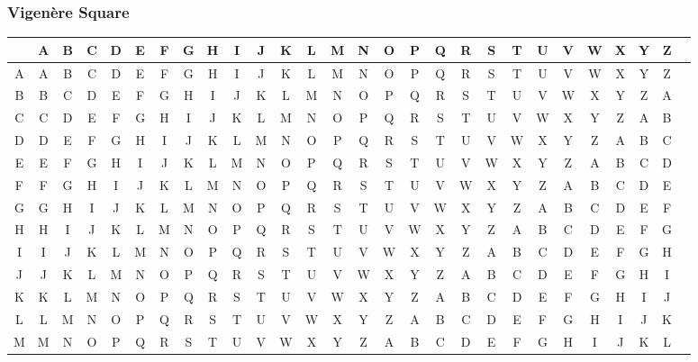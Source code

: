 \documentclass[12pt]{beamer}
\begin{document}
\begin{frame}
	
	\frametitle{Vigen\`{e}re Square}
	
	\begin{adjustbox}{max width=\textwidth}
		
		\begin{tabular}{| c || c | c | c | c | c | c | c | c | c | c | c | c | c | c | c | c | c | c | c | c | c | c | c | c | c | c | c ||}
			\hline
			& A & B & C & D & E & F & G & H & I & J & K & L & M & N & O & P & Q & R & S & T & U & V & W & X & Y & Z \\
			\hline\hline
			A & A & B & C & D & E & F & G & H & I & J & K & L & M & N & O & P & Q & R & S & T & U & V & W & X & Y & Z \\ \hline
			B & B & C & D & E & F & G & H & I & J & K & L & M & N & O & P & Q & R & S & T & U & V & W & X & Y & Z & A \\ \hline
			C & C & D & E & F & G & H & I & J & K & L & M & N & O & P & Q & R & S & T & U & V & W & X & Y & Z & A & B \\ \hline
			D & D & E & F & G & H & I & J & K & L & M & N & O & P & Q & R & S & T & U & V & W & X & Y & Z & A & B & C \\ \hline
			E & E & F & G & H & I & J & K & L & M & N & O & P & Q & R & S & T & U & V & W & X & Y & Z & A & B & C & D \\ \hline
			F & F & G & H & I & J & K & L & M & N & O & P & Q & R & S & T & U & V & W & X & Y & Z & A & B & C & D & E \\ \hline
			G & G & H & I & J & K & L & M & N & O & P & Q & R & S & T & U & V & W & X & Y & Z & A & B & C & D & E & F \\ \hline
			H & H & I & J & K & L & M & N & O & P & Q & R & S & T & U & V & W & X & Y & Z & A & B & C & D & E & F & G \\ \hline
			I & I & J & K & L & M & N & O & P & Q & R & S & T & U & V & W & X & Y & Z & A & B & C & D & E & F & G & H \\ \hline
			J & J & K & L & M & N & O & P & Q & R & S & T & U & V & W & X & Y & Z & A & B & C & D & E & F & G & H & I \\ \hline
			K & K & L & M & N & O & P & Q & R & S & T & U & V & W & X & Y & Z & A & B & C & D & E & F & G & H & I & J \\ \hline
			L & L & M & N & O & P & Q & R & S & T & U & V & W & X & Y & Z & A & B & C & D & E & F & G & H & I & J & K \\ \hline
			M & M & N & O & P & Q & R & S & T & U & V & W & X & Y & Z & A & B & C & D & E & F & G & H & I & J & K & L \\ \hline

\end{tabular}
\end{adjustbox}
\end{frame}
\end{document}
